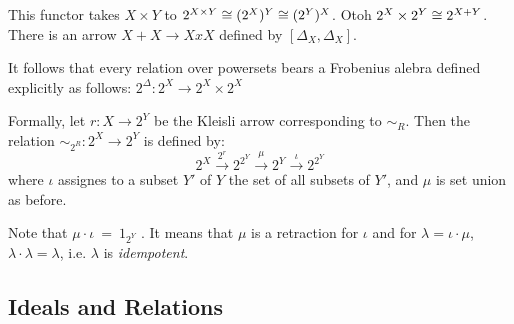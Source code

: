 This functor takes
$X\times Y$ to $2^{X\times Y} \cong (2^X)^Y \cong (2^Y)^X$. Otoh $2^X \times
2^Y \cong 2^{X + Y}$. There is an arrow $X + X \to X x X$ defined by
$[ \Delta_X, \Delta_X]$. 

It follows that every
relation over powersets bears a Frobenius alebra defined explicitly as
follows:
$2^\Delta : 2^X \to 2^X \times 2^X$




Formally, let $r : X \to 2^Y$ be the Kleisli arrow corresponding to
$\sim_R$. Then the relation $\sim_{2^R} : 2^X \to 2^Y$ is defined by:
\[
2^X \xrightarrow{2^r} 2^{2^Y} \xrightarrow{\mu} 2^Y
\xrightarrow{\iota} 2^{2^Y}
\]
where $\iota$ assignes to a subset $Y'$ of $Y$ the set of all subsets
of $Y'$, and $\mu$ is set union as before. 

Note that $\mu\cdot \iota ~ = ~ 1_{2^Y}$ . It means
that $\mu$ is a retraction for $\iota$ and for $\lambda = \iota\cdot
\mu$,  $\lambda\cdot \lambda = \lambda$, i.e. $\lambda$ is \emph{idempotent}. 









\subsection{Ideals and Relations}


